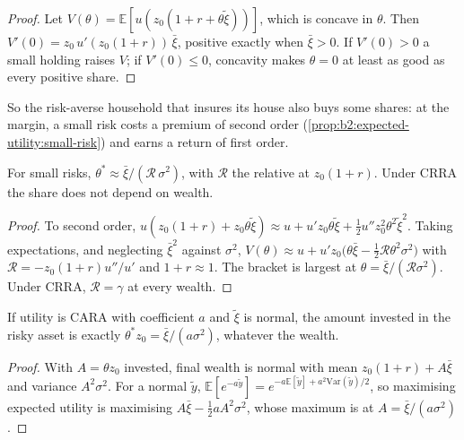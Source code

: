 \begin{proof}
Let $V(\theta) = \mathbb{E}[u(z_0(1 + r + \theta\tilde\xi))]$, which is concave in $\theta$. Then
$V'(0) = z_0\,u'(z_0(1 + r))\,\bar\xi$, positive exactly when $\bar\xi > 0$. If $V'(0) > 0$ a small
holding raises $V$; if $V'(0) \le 0$, concavity makes $\theta = 0$ at least as good as every positive
share.
\end{proof}

So the risk-averse household that insures its house also buys some shares: at the margin, a small
risk costs a premium of second order (\cref{prop:b2:expected-utility:small-risk}) and earns a return of
first order.

\begin{proposition}\label{prop:b2:insurance-and-risk-sharing:share}
For small risks, $\theta^{*} \approx \bar\xi/(\mathcal{R}\,\sigma^2)$, with $\mathcal{R}$ the relative
 at $z_0(1 + r)$. Under CRRA the share does not depend on wealth.
\end{proposition}

\begin{proof}
To second order, $u(z_0(1 + r) + z_0\theta\tilde\xi) \approx u + u'z_0\theta\tilde\xi +
\tfrac12u''z_0^2\theta^2\tilde\xi^2$. Taking expectations, and neglecting $\bar\xi^2$ against
$\sigma^2$, $V(\theta) \approx u + u'z_0\bigl(\theta\bar\xi - \tfrac12\mathcal{R}\theta^2\sigma^2
\bigr)$ with $\mathcal{R} = -z_0(1 + r)u''/u'$ and $1 + r \approx 1$. The bracket is largest at $\theta
= \bar\xi/(\mathcal{R}\sigma^2)$. Under CRRA, $\mathcal{R} = \gamma$ at every wealth.
\end{proof}

\begin{proposition}\label{prop:b2:insurance-and-risk-sharing:cara-normal}
If utility is CARA with coefficient $a$ and $\tilde\xi$ is normal, the amount invested in the risky
asset is exactly $\theta^{*}z_0 = \bar\xi/(a\sigma^2)$, whatever the wealth.
\end{proposition}

\begin{proof}
With $A = \theta z_0$ invested, final wealth is normal with mean $z_0(1 + r) + A\bar\xi$ and variance
$A^2\sigma^2$. For a normal $\tilde y$, $\mathbb{E}[e^{-a\tilde y}] = e^{-a\mathbb{E}[\tilde y] +
a^2\mathrm{Var}(\tilde y)/2}$, so maximising expected utility is maximising $A\bar\xi -
\tfrac12aA^2\sigma^2$, whose maximum is at $A = \bar\xi/(a\sigma^2)$.
\end{proof}

